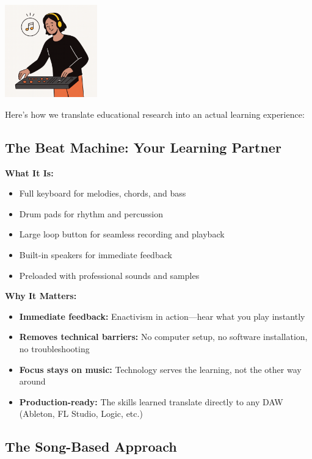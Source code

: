 \documentclass[11pt,letterpaper]{article}
\begin{document}
\begin{center}
\includegraphics[width=0.3\textwidth]{Illustrations/Producer.png}
\end{center}

\vspace{0.5cm}

Here's how we translate educational research into an actual learning experience:

\subsection*{The Beat Machine: Your Learning Partner}

\textbf{What It Is:}
\begin{itemize}[leftmargin=*]
\item Full keyboard for melodies, chords, and bass
\item Drum pads for rhythm and percussion
\item Large loop button for seamless recording and playback
\item Built-in speakers for immediate feedback
\item Preloaded with professional sounds and samples
\end{itemize}

\textbf{Why It Matters:}
\begin{itemize}[leftmargin=*]
\item \textbf{Immediate feedback:} Enactivism in action—hear what you play instantly
\item \textbf{Removes technical barriers:} No computer setup, no software installation, no troubleshooting
\item \textbf{Focus stays on music:} Technology serves the learning, not the other way around
\item \textbf{Production-ready:} The skills learned translate directly to any DAW (Ableton, FL Studio, Logic, etc.)
\end{itemize}

\subsection*{The Song-Based Approach}
\end{document}
